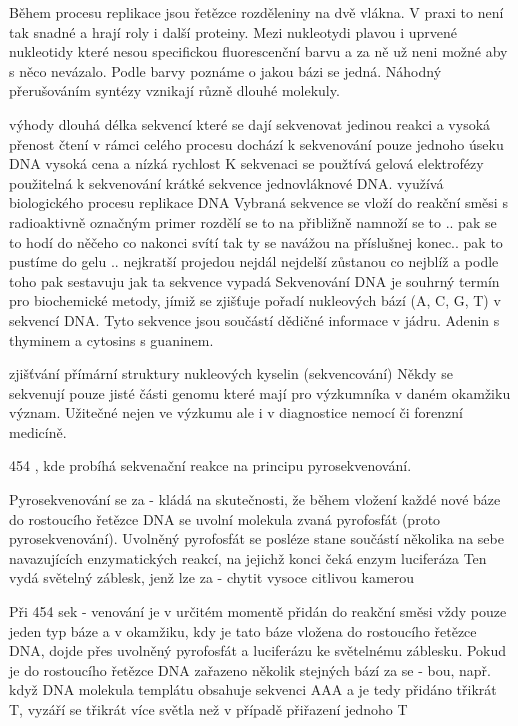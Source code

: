 \documentclass[czech,DP]{thesiskiv}
\numberwithin{equation}{section}
\begin{document}
Během procesu replikace jsou řetězce rozděleniny na dvě vlákna. 
V praxi to není tak snadné a hrají roly i další proteiny. 
Mezi nukleotydi plavou i uprvené nukleotidy které nesou specifickou fluorescenční barvu a za ně už neni možné aby s něco nevázalo.  Podle barvy poznáme o jakou bázi se jedná. 
Náhodný přerušováním syntézy vznikají různě dlouhé molekuly. 

výhody dlouhá délka sekvencí které se dají sekvenovat jedinou reakci a vysoká přenost čtení
v rámci celého procesu dochází k sekvenování pouze jednoho úseku DNA 
vysoká cena a nízká rychlost
 K sekvenaci se použtívá gelová elektrofézy
 použitelná k sekvenování krátké sekvence jednovláknové DNA. 
 využívá biologického procesu replikace DNA
 Vybraná sekvence se vloží do reakční směsi s radioaktivně označným primer
 rozdělí se to na přibližně 
 namnoží se to .. 
 pak se to hodí do něčeho co nakonci svítí tak ty se navážou na příslušnej konec.. 
 pak to pustíme do gelu .. 
 nejkratší projedou nejdál
 nejdelší zůstanou co nejblíž a podle toho pak sestavuju jak ta sekvence vypadá
Sekvenování DNA je souhrný termín pro biochemické metody, jímiž se zjišťuje pořadí nukleových bází (A, C, G, T) v sekvencí DNA. Tyto sekvence jsou součástí dědičné informace v jádru.
Adenin s thyminem a cytosins s guaninem.

zjišťvání přímární struktury nukleových kyselin (sekvencování)
Někdy se sekvenují pouze jisté části genomu které mají pro výzkumníka v daném okamžiku význam.
Užitečné nejen ve výzkumu ale i v diagnostice nemocí či forenzní medicíně. 


454 
, kde probíhá sekvenační reakce na principu pyrosekvenování.  

 Pyrosekvenování se za -
kládá na skutečnosti, že během vložení
každé nové báze do rostoucího řetězce
DNA se uvolní molekula zvaná pyrofosfát
(proto pyrosekvenování). Uvolněný pyrofosfát se posléze stane součástí několika
na sebe navazujících enzymatických reakcí, na jejichž konci čeká enzym luciferáza
Ten vydá světelný záblesk, jenž lze za -
chytit vysoce citlivou kamerou


 Při 454 sek -
venování je v určitém momentě přidán do
reakční směsi vždy pouze jeden typ báze
a v okamžiku, kdy je tato báze vložena do
rostoucího řetězce DNA, dojde přes uvolněný pyrofosfát a luciferázu ke světelnému
záblesku. Pokud je do rostoucího řetězce
DNA zařazeno několik stejných bází za se -
bou, např. když DNA molekula templátu
obsahuje sekvenci AAA a je tedy přidáno
třikrát T, vyzáří se třikrát více světla než
v případě přiřazení jednoho T
\end{document}
